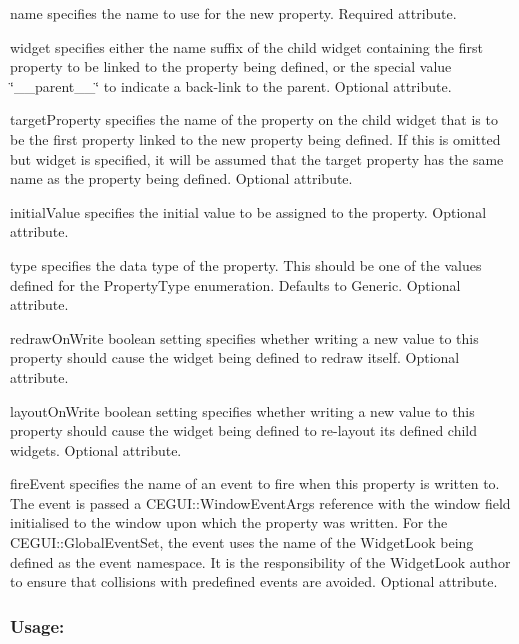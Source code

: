 \begin{DoxyItemize}
\item {\ttfamily name} specifies the name to use for the new property. Required attribute. \item {\ttfamily widget} specifies either the name suffix of the child widget containing the first property to be linked to the property being defined, or the special value {\ttfamily \char`\"{}\+\_\+\+\_\+parent\+\_\+\+\_\+\char`\"{}} to indicate a back-\/link to the parent. Optional attribute. \item {\ttfamily target\+Property} specifies the name of the property on the child widget that is to be the first property linked to the new property being defined. If this is omitted but {\ttfamily widget} is specified, it will be assumed that the target property has the same name as the property being defined. Optional attribute. \item {\ttfamily initial\+Value} specifies the initial value to be assigned to the property. Optional attribute. \item {\ttfamily type} specifies the data type of the property. This should be one of the values defined for the Property\+Type enumeration. Defaults to {\ttfamily Generic}. Optional attribute. \item {\ttfamily redraw\+On\+Write} boolean setting specifies whether writing a new value to this property should cause the widget being defined to redraw itself. Optional attribute. \item {\ttfamily layout\+On\+Write} boolean setting specifies whether writing a new value to this property should cause the widget being defined to re-\/layout it\textquotesingle{}s defined child widgets. Optional attribute. \item {\ttfamily fire\+Event} specifies the name of an event to fire when this property is written to. The event is passed a C\+E\+G\+U\+I\+::\+Window\+Event\+Args reference with the window field initialised to the window upon which the property was written. For the C\+E\+G\+U\+I\+::\+Global\+Event\+Set, the event uses the name of the Widget\+Look being defined as the event namespace. It is the responsibility of the Widget\+Look author to ensure that collisions with predefined events are avoided. Optional attribute.\end{DoxyItemize}
\hypertarget{fal_element_ref_fal_elem_ref_sec_27_3}{}\subsubsection{Usage\+:}\label{fal_element_ref_fal_elem_ref_sec_27_3}


